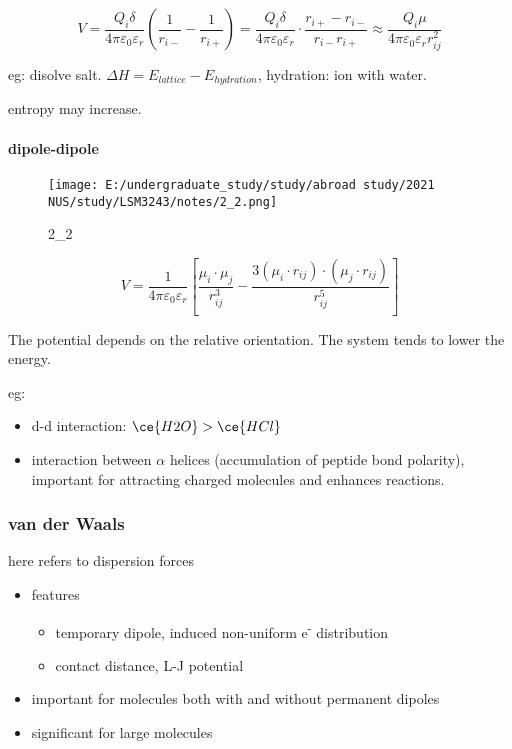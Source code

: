 \documentclass[]{article}
\let\oldparagraph\paragraph
\renewcommand{\paragraph}[1]{\oldparagraph{#1}\mbox{}}
\begin{document}
\[V=\dfrac{Q_i\delta}{4\pi\varepsilon_0\varepsilon_r}(\dfrac{1}{r_{i-}}-\dfrac{1}{r_{i+}})=\dfrac{Q_i\delta}{4\pi\varepsilon_0\varepsilon_r}\cdot\dfrac{r_{i+}-r_{i-}}{r_{i-}r_{i+}}\approx\dfrac{Q_i\mu}{4\pi\varepsilon_0\varepsilon_rr_{ij}^2}\]

eg: disolve salt. \(\Delta H=E_{lattice}-E_{hydration}\), hydration: ion
with water.

entropy may increase.

\hypertarget{dipole-dipole}{%
\paragraph{dipole-dipole}\label{dipole-dipole}}

\begin{figure}
\centering
\texttt{[image: E:/undergraduate\_study/study/abroad study/2021 NUS/study/LSM3243/notes/2\_2.png]}
\caption{2\_2}
\end{figure}

\[V=\dfrac{1}{4\pi\varepsilon_0\varepsilon_r}\left[\dfrac{\mu_i\cdot\mu_j}{r_{ij}^3}-\dfrac{3(\mu_i\cdot r_{ij})\cdot(\mu_j\cdot r_{ij})}{r_{ij}^5}\right]\]

The potential depends on the relative orientation. The system tends to
lower the energy.

eg:

\begin{itemize}
\item
  d-d interaction: \(\ce{H2O}>\ce{HCl}\)
\item
  interaction between \(\alpha\) helices (accumulation of peptide bond
  polarity), important for attracting charged molecules and enhances
  reactions.
\end{itemize}

\hypertarget{van-der-waals}{%
\subsubsection{van der Waals}\label{van-der-waals}}

here refers to dispersion forces

\begin{itemize}
\item
  features

  \begin{itemize}
  \item
    temporary dipole, induced non-uniform e\textsuperscript{-}
    distribution
  \item
    contact distance, L-J potential
  \end{itemize}
\item
  important for molecules both with and without permanent dipoles
\item
  significant for large molecules
\end{itemize}
\end{document}
